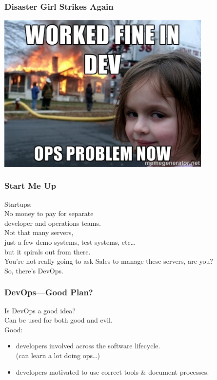 \begin{frame}
\frametitle{Disaster Girl Strikes Again}

\begin{center}
	\includegraphics[width=0.8\textwidth]{images/devops.jpg}
\end{center}

\end{frame}



\begin{frame}
\frametitle{Start Me Up}

\Large
\begin{changemargin}{1cm}
Startups:\\[1em]
No money to pay for separate \\
developer and operations teams.\\[1em]
Not that many servers, \\
just a few demo systems, test systems, etc\ldots\\
but it spirals out from there. \\[1em]
You're not really going to ask Sales to manage these servers, are you? \\
So, there's DevOps. 
\end{changemargin}

\end{frame}



\begin{frame}
\frametitle{DevOps---Good Plan?}

\large
\begin{changemargin}{1cm}
Is DevOps a good idea? \\
Can be used for both good and evil. \\[1em]
Good:
\begin{itemize}
\item developers involved across the software lifecycle.\\
(can learn a lot doing ops\ldots )
\item developers motivated to use correct tools \& document processes.
\end{itemize}
\end{changemargin}

\end{frame}



